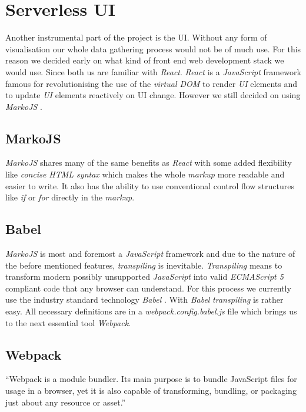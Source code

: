 \section{Serverless UI}

Another instrumental part of the project is the UI. Without any form of visualisation our whole data
gathering process would not be of much use. For this reason we decided early on what kind of front
end web development stack we would use. Since both us are familiar with \textit{React}.
\textit{React} is a \textit{JavaScript} framework famous for revolutionising the use of the
\textit{virtual DOM} to render \textit{UI} elements and to update \textit{UI} elements reactively on
UI change. However we still decided on using \textit{MarkoJS} \cite{marko}.

\subsection{MarkoJS}

\textit{MarkoJS} shares many of the same benefits as \textit{React} with some added flexibility like
\textit{concise HTML syntax} which makes the whole \textit{markup} more readable and easier to
write. It also has the ability to use conventional control flow structures like \textit{if} or
\textit{for} directly in the \textit{markup}.

\subsection{Babel}

\textit{MarkoJS} is most and foremost a \textit{JavaScript} framework and due to the nature of the
before mentioned features, \textit{transpiling} is inevitable. \textit{Transpiling} means to
transform modern possibly unsupported \textit{JavaScript} into valid \textit{ECMAScript 5} compliant
code that any browser can understand. For this process we currently use the industry standard
technology \textit{Babel} \cite{babel}. With \textit{Babel} \textit{transpiling} is rather easy. All
necessary definitions are in a \textit{webpack.config.babel.js} file which brings us to the next
essential tool \textit{Webpack}.

\subsection{Webpack}
\label{sec:webpack}

“Webpack is a module bundler. Its main purpose is to bundle JavaScript files for usage in a browser,
yet it is also capable of transforming, bundling, or packaging just about any resource or asset.”
\cite{webpack}

